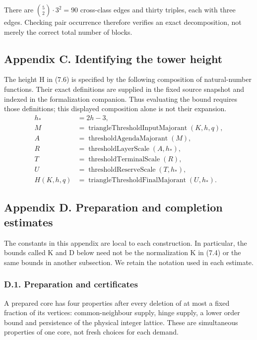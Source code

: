 \documentclass[english,11pt,a4paper]{article}
\begin{document}
There are \(\binom52\cdot3^2=90\) cross-class edges and thirty triples, each with three edges. Checking pair occurrence therefore verifies an exact decomposition, not merely the correct total number of blocks.

\subsection{Appendix C. Identifying the tower height}\label{appendix-c.-identifying-the-tower-height}

The height H in (7.6) is specified by the following composition of natural-number functions. Their exact definitions are supplied in the fixed source snapshot and indexed in the formalization companion. Thus evaluating the bound requires those definitions; this displayed composition alone is not their expansion.
\[\begin{aligned}
h_*&=2h-3,\\
M&=\operatorname{triangleThresholdInputMajorant}(K,h,q),\\
A&=\operatorname{thresholdAgendaMajorant}(M),\\
R&=\operatorname{thresholdLayerScale}(A,h_*),\\
T&=\operatorname{thresholdTerminalScale}(R),\\
U&=\operatorname{thresholdReserveScale}(T,h_*),\\
H(K,h,q)&=\operatorname{triangleThresholdFinalMajorant}(U,h_*).
\end{aligned}                                                       \tag{C.1}\]

\subsection{Appendix D. Preparation and completion estimates}\label{appendix-d.-preparation-and-completion-estimates}

The constants in this appendix are local to each construction. In particular, the bounds called K and D below need not be the normalization K in (7.4) or the same bounds in another subsection. We retain the notation used in each estimate.

\subsubsection{D.1. Preparation and certificates}\label{d.1.-preparation-and-certificates}

A prepared core has four properties after every deletion of at most a fixed fraction of its vertices: common-neighbour supply, hinge supply, a lower order bound and persistence of the physical integer lattice. These are simultaneous properties of one core, not fresh choices for each demand.
\end{document}
